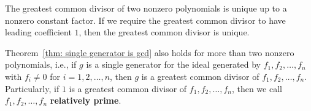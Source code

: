 \documentclass{ctexart}
\begin{document}
    \begin{myrmk}
        The greatest common divisor of two nonzero polynomials is unique up to a nonzero constant factor. If we require the greatest common divisor to have leading coefficient $1$, then the greatest common divisor is unique.

        Theorem~\ref{thm: single generator is gcd} also holds for more than two nonzero polynomials, i.e., if $g$ is a single generator for the ideal generated by $f_1, f_2, \ldots, f_n$ with $f_i \ne 0$ for $i = 1, 2, \ldots, n$, then $g$ is a greatest common divisor of $f_1, f_2, \ldots, f_n$. Particularly, if $1$ is a greatest common divisor of $f_1, f_2, \ldots, f_n$, then we call $f_1, f_2, \ldots, f_n$ \textbf{relatively prime}.
    \end{myrmk}
	\newpage

	\appendix
\end{document}
